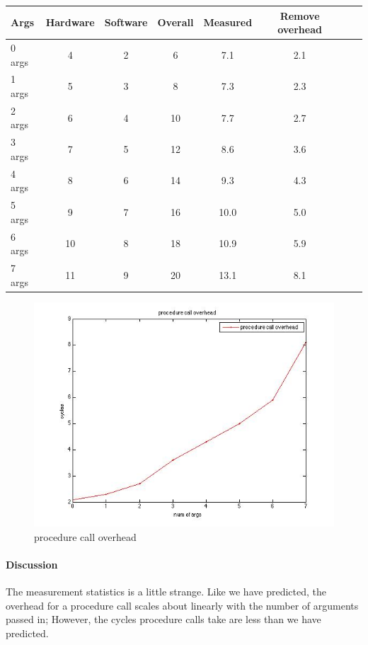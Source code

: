 \begin{center}
\begin{tabular}{l*{6}{c}r}
Args              & Hardware  & Software  & Overall  & Measured  & Remove overhead\\
\hline
0 args & 4 & 2 & 6 & 7.1 & 2.1 \\
1 args & 5 & 3 & 8 & 7.3  & 2.3 \\
2 args & 6 & 4 & 10 & 7.7 & 2.7 \\
3 args & 7 & 5 & 12 & 8.6 & 3.6 \\
4 args & 8 & 6 & 14 & 9.3 & 4.3\\
5 args & 9 & 7 & 16 & 10.0 & 5.0\\
6 args & 10 & 8 & 18 & 10.9 & 5.9\\
7 args & 11 & 9 & 20 & 13.1 & 8.1\\
\end{tabular}
\end{center}

\begin{figure}[htbp] %
   \centering
   \includegraphics[width=5in]{./pics/pcall.jpg} 
   \caption{procedure call overhead}
   \label{fig:procedure call overhead}
\end{figure}

\paragraph{Discussion}
The measurement statistics is a little strange. Like we have predicted, the overhead for a procedure call scales about linearly with the number of arguments passed in; However, the cycles procedure calls take are less than we have predicted. 

